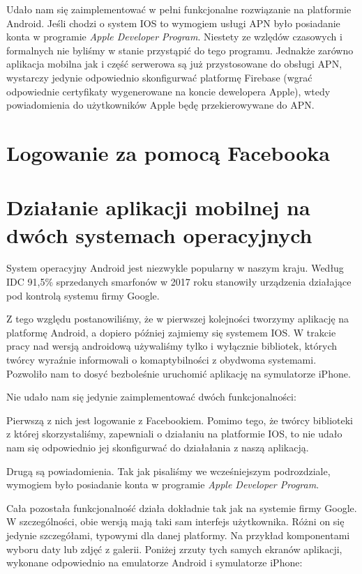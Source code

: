 \documentclass[licencjacka]{pracamgr}
\begin{document}
Udało nam się zaimplementować w pełni funkcjonalne rozwiązanie na platformie Android. Jeśli chodzi o system IOS to wymogiem usługi APN było posiadanie konta w programie \textit{Apple Developer Program}. Niestety ze wzlędów czasowych i formalnych nie byliśmy w stanie przystąpić do tego programu. Jednakże zarówno aplikacja mobilna jak i część serwerowa są już przystosowane do obsługi APN, wystarczy jedynie odpowiednio skonfigurwać platformę Firebase (wgrać odpowiednie certyfikaty wygenerowane na koncie dewelopera Apple), wtedy powiadomienia do użytkowników Apple będę przekierowywane do APN.  

\section{Logowanie za pomocą Facebooka}

\section{Działanie aplikacji mobilnej na dwóch systemach operacyjnych} 
System operacyjny Android jest niezwykle popularny w naszym kraju. Według IDC 91,5\% sprzedanych smarfonów w 2017 roku stanowiły urządzenia działające pod kontrolą systemu firmy Google.

Z tego względu postanowiliśmy, że w pierwszej kolejności tworzymy aplikację na platformę Android, a dopiero później zajmiemy się systemem IOS. W trakcie pracy nad wersją androidową używaliśmy tylko i wyłącznie bibliotek, których twórcy wyraźnie informowali o komaptybilności z obydwoma systemami. Pozwoliło nam to dosyć bezboleśnie uruchomić aplikację na symulatorze iPhone. 

Nie udało nam się jedynie zaimplementować dwóch funkcjonalności:

Pierwszą z nich jest logowanie z Facebookiem. Pomimo tego, że twórcy biblioteki z której skorzystaliśmy, zapewniali o działaniu na platformie IOS, to nie udało nam się odpowiednio jej skonfigurwać do działałania z naszą aplikacją.

Drugą są powiadomienia. Tak jak pisaliśmy we wcześniejszym podrozdziale, wymogiem było posiadanie konta w programie \textit{Apple Developer Program}. 

Cała pozostała funkcjonalność działa dokładnie tak jak na systemie firmy Google. W szczególności, obie wersją mają taki sam interfejs użytkownika. Różni on się jedynie szczegółami, typowymi dla danej platformy. Na przykład komponentami wyboru daty lub zdjęć z galerii. Poniżej zrzuty tych samych ekranów aplikacji, wykonane odpowiednio na emulatorze Android i symulatorze iPhone:
\end{document}
